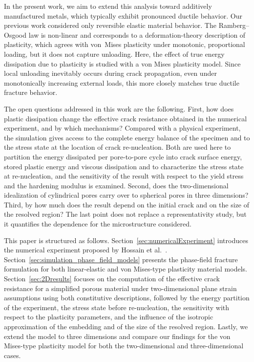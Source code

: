 \documentclass[pdflatex,sn-mathphys-num]{sn-jnl}%
\theoremstyle{thmstyleone}%
\theoremstyle{thmstyletwo}%
\theoremstyle{thmstylethree}%
\begin{document}
In the present work, we aim to extend this analysis
toward additively manufactured metals, which typically exhibit pronounced ductile behavior.
Our previous work considered only reversible elastic material behavior. The Ramberg--Osgood law is non-linear and corresponds to a deformation-theory description of plasticity, which agrees with von~Mises plasticity under monotonic, proportional loading, but it does not capture unloading. Here, the effect of true energy dissipation due to plasticity is studied with a von Mises plasticity model.
Since local unloading inevitably occurs during crack propagation,
even under monotonically increasing external loads,
this more closely matches true ductile fracture behavior.

The open questions addressed in this work are the following. First, how does plastic dissipation change the effective crack resistance obtained in the numerical experiment, and by which mechanisms? Compared with a physical experiment, the simulation gives access to the complete energy balance of the specimen and to the stress state at the location of crack re-nucleation. Both are used here to partition the energy dissipated per pore-to-pore cycle into crack surface energy, stored plastic energy and viscous dissipation and to characterize the stress state at re-nucleation, and the sensitivity of the result with respect to the yield stress and the hardening modulus is examined. Second, does the two-dimensional idealization of cylindrical pores carry over to spherical pores in three dimensions? Third, by how much does the result depend on the initial crack and on the size of the resolved region? The last point does not replace a representativity study, but it quantifies the dependence for the microstructure considered.

This paper is structured as follows.
Section~\ref{sec:numericalExperiment} introduces the numerical experiment
proposed by Hossain et al.~\cite{hossain_effective_2014}.
Section~\ref{sec:simulation_phase_field_models} presents the phase-field
fracture formulation for both linear-elastic and von Mises-type plasticity material models.
Section~\ref{sec:2Dresults} focuses on the computation
of the effective crack resistance for a simplified porous material
under two-dimensional plane strain assumptions
 using both constitutive descriptions, followed by the energy partition of the experiment, the stress state before re-nucleation, the sensitivity with respect to the plasticity parameters, and the influence of the isotropic approximation of the embedding and of the size of the resolved region.
Lastly, we extend the model to three dimensions and compare our findings for the von Mises-type plasticity model
for both the two-dimensional and three-dimensional cases.
\end{document}
